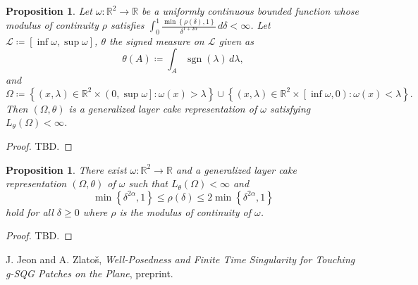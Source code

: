 \documentclass[reqno,centertags,12pt]{amsart}
\newtheorem{proposition}[theorem]{Proposition}
\theoremstyle{definition}
\numberwithin{equation}{section}
\newcommand{\set}[1]{\left\{ #1 \right\}}
\newcommand{\bbR}{{\mathbb{R}}}
\newcommand{\tht}{\theta}
\begin{document}
\begin{proposition}
    Let $\omega\colon\bbR^{2}\to\bbR$ be a uniformly continuous bounded function
    whose modulus of continuity $\rho$ satisfies
    $\int_{0}^{1}\frac{\min\set{\rho(\delta),1}}{\delta^{1+2\alpha}}\,d\delta < \infty$.
    Let $\mathcal{L}\coloneqq \left[
        \inf\omega,
        \sup\omega
    \right]$, $\theta$ the signed measure on $\mathcal{L}$ given as
    \[
        \theta(A) \coloneqq \int_{A}\operatorname{sgn}(\lambda)\,d\lambda,
    \]
    and
    \[
        \Omega\coloneqq \set{(x,\lambda)\in
        \bbR^{2}\times\left(0,\sup\omega\right]
        \colon
        \omega(x) > \lambda}
        \cup
        \set{(x,\lambda)\in
        \bbR^{2}\times\left[\inf\omega,0\right)
        \colon
        \omega(x) < \lambda}.
    \]
    Then $(\Omega,\theta)$ is a generalized layer cake representation of $\omega$
    satisfying $L_{\tht}(\Omega) < \infty$.
\end{proposition}

\begin{proof}
    TBD.
\end{proof}

\begin{proposition}
    There exist $\omega\colon\bbR^{2}\to\bbR$ and
    a generalized layer cake representation $(\Omega,\theta)$ of $\omega$
    such that $L_{\tht}(\Omega)<\infty$ and
    \[
        \min\left\{\delta^{2\alpha},1\right\}
        \leq \rho(\delta) \leq
        2\min\left\{\delta^{2\alpha},1\right\}
    \]
    hold for all $\delta\geq 0$ where $\rho$ is the modulus of continuity of $\omega$.
\end{proposition}

\begin{proof}
    TBD.
\end{proof}




\begin{thebibliography}{10}

J. Jeon and A. Zlato\v{s},
\textit{Well-Posedness and Finite Time Singularity for Touching g-SQG Patches on the Plane},
preprint.


\end{thebibliography}
\end{document}
